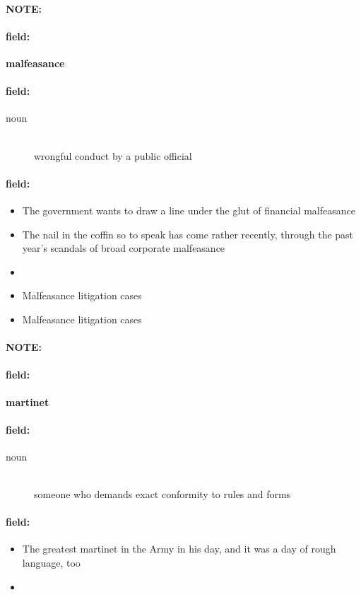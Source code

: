 \documentclass[12pt]{article}
\newenvironment{note}{\paragraph{NOTE:}}{}
\newenvironment{field}{\paragraph{field:}}{}
\begin{document}
\begin{note}
\begin{field}
\textbf{\large malfeasance}
\end{field}


\begin{field}
\begin{description}
\item[noun] \hfill \\ 
wrongful conduct by a public official

\end{description}
\end{field}

\begin{field}
\begin{itemize}
\item The government wants to draw a line under the glut of financial malfeasance
\item The nail in the coffin so to speak has come rather recently, through the past year's scandals of broad corporate malfeasance
\item 
\item Malfeasance litigation cases
\item Malfeasance litigation cases
\end{itemize}
\end{field}
\end{note}
\begin{note}
\begin{field}
\textbf{\large martinet}
\end{field}


\begin{field}
\begin{description}
\item[noun] \hfill \\ 
someone who demands exact conformity to rules and forms

\end{description}
\end{field}

\begin{field}
\begin{itemize}
\item The greatest martinet in the Army in his day, and it was a day of rough language, too
\item 
\end{itemize}
\end{field}
\end{note}
\end{document}
